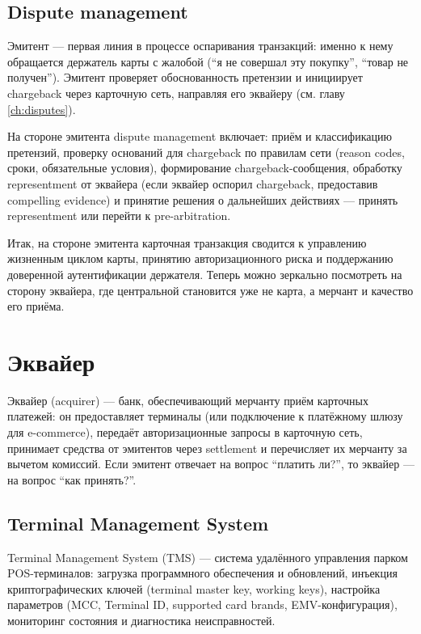 \subsection*{Dispute management}

Эмитент — первая линия в процессе оспаривания транзакций:
именно к нему обращается держатель карты с жалобой
(\enquote{я не совершал эту покупку}, \enquote{товар
  не получен}). Эмитент проверяет обоснованность претензии
и инициирует chargeback через карточную сеть, направляя его
эквайеру (см. главу \ref{ch:disputes}).

На стороне эмитента dispute management включает: приём
и классификацию претензий, проверку оснований для chargeback
по правилам сети (reason codes, сроки, обязательные
условия), формирование chargeback-сообщения, обработку
representment от эквайера (если эквайер оспорил chargeback,
предоставив compelling evidence) и принятие решения
о дальнейших действиях — принять representment или перейти
к pre-arbitration.

Итак, на стороне эмитента карточная транзакция сводится
к управлению жизненным циклом карты, принятию авторизационного
риска и поддержанию доверенной аутентификации держателя. Теперь
можно зеркально посмотреть на сторону эквайера, где центральной
становится уже не карта, а мерчант и качество его приёма.

\section{Эквайер}
\label{sec:ia-acquirer}

Эквайер (acquirer) — банк, обеспечивающий мерчанту приём
карточных платежей: он предоставляет терминалы (или подключение
к платёжному шлюзу для e-commerce), передаёт авторизационные
запросы в карточную сеть, принимает средства от эмитентов
через settlement и перечисляет их мерчанту за вычетом комиссий.
Если эмитент отвечает на вопрос \enquote{платить ли?},
то эквайер — на вопрос \enquote{как принять?}.

\subsection*{Terminal Management System}

\begin{kaobox}[title={Определение: TMS}, colback=blue!4, colbacktitle=blue!15]
  Terminal Management System (TMS) — система удалённого
  управления парком POS-терминалов: загрузка программного
  обеспечения и обновлений, инъекция криптографических ключей
  (terminal master key, working keys), настройка параметров
  (MCC, Terminal ID, supported card brands, EMV-конфигурация),
  мониторинг состояния и диагностика неисправностей.
\end{kaobox}

